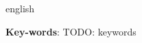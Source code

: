 \begin{resumo}[Abstract]
 \begin{otherlanguage*}{english}


   \vspace{\onelineskip}

   \noindent
   \textbf{Key-words}: TODO: keywords
 \end{otherlanguage*}
\end{resumo}
